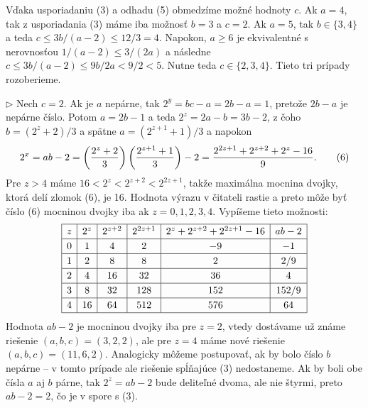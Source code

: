 {Vďaka usporiadaniu (3) a odhadu (5) obmedzíme možné hodnoty $c$. Ak $a=4$, tak z usporiadania (3) máme iba možnosť $b=3$ a $c=2$. Ak $a=5$, tak $b\in\{3,4\}$ a teda $c\le 3b/(a-2)\le 12/3=4$. Napokon, $a\ge 6$ je ekvivalentné s nerovnosťou $1/(a-2)\le 3/(2a)$ a následne $c\le 3b/(a-2)\le 9b/2a<9/2<5$. Nutne teda $c\in\{2,3,4\}$. Tieto tri prípady rozoberieme.

\item{$\triangleright$} Nech $c=2$. Ak je $a$ nepárne, tak $2^y=bc-a=2b-a=1$, pretože $2b-a$ je nepárne číslo. Potom $a=2b-1$ a teda $2^z=2a-b=3b-2$, z čoho $b=(2^z+2)/3$ a spätne $a=(2^{z+1}+1)/3$ a napokon
$$
2^x=ab-2=\left(\frac{2^z+2}{3}\right)\left(\frac{2^{z+1}+1}{3}\right)-2=\frac{2^{2z+1}+2^{z+2}+2^z-16}{9}.
\tag6
$$
Pre $z>4$ máme $16<2^z<2^{z+2}<2^{2z+1}$, takže maximálna mocnina dvojky, ktorá delí zlomok (6), je 16. Hodnota výrazu v čitateli rastie a preto môže byť číslo (6) mocninou dvojky iba ak $z=0,1,2,3,4$. Vypíšeme tieto možnosti:
$$
\vbox{\let\\=\cr\everycr{\noalign{\hrule}}\offinterlineskip
\def\strut{\vrule width 0pt height1em depth.45em\relax}
\halign{\vrule\strut\enspace\hss$#$\hss\enspace\vrule&&\hss\enspace$#$\enspace\hss\vrule\cr
z&2^z&2^{z+2}&2^{2z+1}&2^z+2^{z+2}+2^{2z+1}-16&ab-2\\
0&	1&	4&	2&	-9&	-1\\
1&	2&	8&	8&	2&	2/9\\
2&	4&	16&	32&	36&	4\\
3&	8&	32&	128&	152&	152/9\\
4&	16&	64&	512&	576&	64\\
}}
$$
Hodnota $ab-2$ je mocninou dvojky iba pre $z=2$, vtedy dostávame už známe riešenie $(a,b,c)=(3,2,2)$, ale pre $z=4$ máme nové riešenie $(a,b,c)=(11,6,2)$. Analogicky môžeme postupovať, ak by bolo číslo $b$ nepárne -- v tomto prípade ale riešenie spĺňajúce (3) nedostaneme. Ak by boli obe čísla $a$ aj $b$ párne, tak $2^z=ab-2$ bude deliteľné dvoma, ale nie štyrmi, preto $ab-2=2$, čo je v spore s (3).

}
